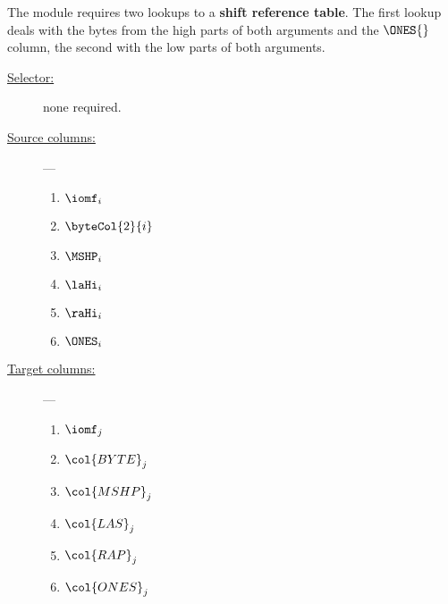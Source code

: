 The \shfMod{} module requires two lookups to a \textbf{shift reference table}. The first lookup deals with the bytes from the high parts of both arguments and the $\ONES{}$ column, the second with the low parts of both arguments.


\begin{description}
	\item[\underline{Selector:}] none required.
	\item[\underline{Source columns:}] ---
	\begin{multicols}{2}
		\begin{enumerate}
			\item $\iomf_{i}$
			\item $\byteCol{2}{i}$
			\item $\MSHP_{i}$
			\item $\laHi_{i}$
			\item $\raHi_{i}$
			\item $\ONES_{i}$
		\end{enumerate}
	\end{multicols}
	\item[\underline{Target columns:}] ---
	\begin{multicols}{2}
		\begin{enumerate}
			\item $\iomf_{j}$
			\item $\col{BYTE}_{j}$
			\item $\col{MSHP}_{j}$
			\item $\col{LAS}_{j}$
			\item $\col{RAP}_{j}$
			\item $\col{ONES}_{j}$
		\end{enumerate}
	\end{multicols}
\end{description}

